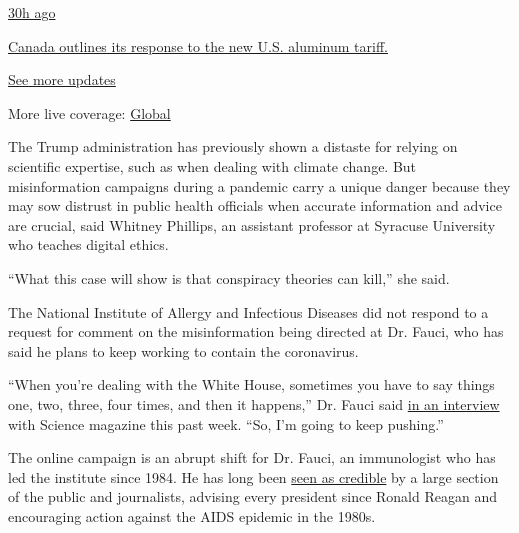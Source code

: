 \href{https://www.nytimes.com/live/2020/08/07/business/stock-market-today-coronavirus?action=click\&pgtype=Article\&state=default\&region=MAIN_CONTENT_1\&context=storylines_live_updates\#canada-outlines-its-response-to-the-new-us-aluminum-tariff}{30h
ago}

\href{https://www.nytimes.com/live/2020/08/07/business/stock-market-today-coronavirus?action=click\&pgtype=Article\&state=default\&region=MAIN_CONTENT_1\&context=storylines_live_updates\#canada-outlines-its-response-to-the-new-us-aluminum-tariff}{Canada
outlines its response to the new U.S. aluminum tariff.}

\href{https://www.nytimes.com/live/2020/08/07/business/stock-market-today-coronavirus?action=click\&pgtype=Article\&state=default\&region=MAIN_CONTENT_1\&context=storylines_live_updates}{See
more updates}

More live coverage:
\href{https://www.nytimes.com/2020/08/07/world/covid-19-news.html?action=click\&pgtype=Article\&state=default\&region=MAIN_CONTENT_1\&context=storylines_live_updates}{Global}

The Trump administration has previously shown a distaste for relying on
scientific expertise, such as when dealing with climate change. But
misinformation campaigns during a pandemic carry a unique danger because
they may sow distrust in public health officials when accurate
information and advice are crucial, said Whitney Phillips, an assistant
professor at Syracuse University who teaches digital ethics.

``What this case will show is that conspiracy theories can kill,'' she
said.

The National Institute of Allergy and Infectious Diseases did not
respond to a request for comment on the misinformation being directed at
Dr. Fauci, who has said he plans to keep working to contain the
coronavirus.

``When you're dealing with the White House, sometimes you have to say
things one, two, three, four times, and then it happens,'' Dr. Fauci
said
\href{https://www.sciencemag.org/news/2020/03/i-m-going-keep-pushing-anthony-fauci-tries-make-white-house-listen-facts-pandemic}{in
an interview} with Science magazine this past week. ``So, I'm going to
keep pushing.''

The online campaign is an abrupt shift for Dr. Fauci, an immunologist
who has led the institute since 1984. He has long been
\href{https://www.nytimes.com/2020/03/08/health/fauci-coronavirus.html}{seen
as credible} by a large section of the public and journalists, advising
every president since Ronald Reagan and encouraging action against the
AIDS epidemic in the 1980s.

